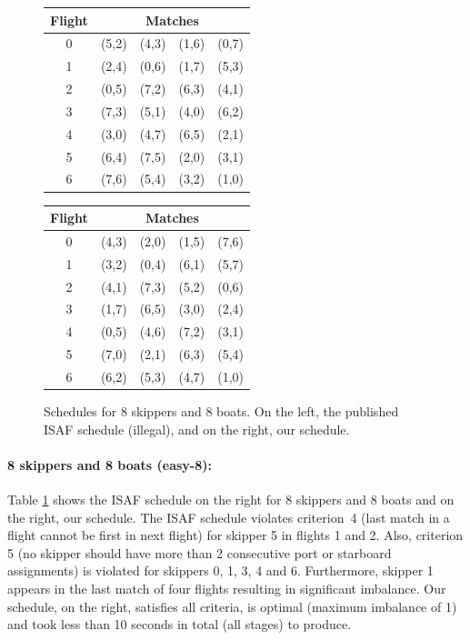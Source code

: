 \documentclass{llncs}
\begin{document}
\begin{center}
\begin{figure}[h]
\begin{minipage}[t]{0.48\textwidth}
    \centering
\begin{tabular}{ccccc}
        \toprule
        Flight & \multicolumn{4}{c}{Matches} \\ \midrule
0 & (5,2) & (4,3) & (1,6) & (0,7) \\
1 & (2,4) & (0,6) & (1,7) & (5,3) \\
2 & (0,5) & (7,2) & (6,3) & (4,1) \\
3 & (7,3) & (5,1) & (4,0) & (6,2) \\
4 & (3,0) & (4,7) & (6,5) & (2,1) \\
5 & (6,4) & (7,5) & (2,0) & (3,1) \\
6 & (7,6) & (5,4) & (3,2) & (1,0) \\ \bottomrule
    \end{tabular}
\label{08-08a}
\end{minipage}
\hfill
\begin{minipage}[t]{0.48\textwidth}
    \centering
\begin{tabular}{ccccc}
        \toprule
        Flight & \multicolumn{4}{c}{Matches} \\ \midrule
0 & (4,3) & (2,0) & (1,5) & (7,6) \\
1 & (3,2) & (0,4) & (6,1) & (5,7) \\ 
2 & (4,1) & (7,3) & (5,2) & (0,6) \\
3 & (1,7) & (6,5) & (3,0) & (2,4) \\ 
4 & (0,5) & (4,6) & (7,2) & (3,1) \\
5 & (7,0) & (2,1) & (6,3) & (5,4) \\ 
6 & (6,2) & (5,3) & (4,7) & (1,0) \\ \bottomrule
    \end{tabular}
\label{08-08b}
\end{minipage}
\caption{Schedules for 8 skippers and 8 boats. On the left, the published ISAF schedule (illegal),
and on the right, our schedule.}
\label{08-08}
\end{figure}
\end{center}

\paragraph{8 skippers and 8 boats (easy-8):} Table \ref{08-08} shows the ISAF schedule on the right for 8
skippers and 8 boats and on the right, our schedule.  The ISAF schedule violates criterion~4 (last match in a flight cannot be first in next flight) for skipper 5 in flights 1 and 2. Also, criterion 5 (no skipper should have more than 2 consecutive port or starboard assignments) is violated for skippers 0, 1, 3, 4 and 6. Furthermore, skipper 1 appears in the last match of four flights resulting in significant imbalance. Our schedule, on the right, satisfies all criteria, is optimal (maximum imbalance of 1) and took less than 10 seconds in total (all stages) to produce.
\end{document}
